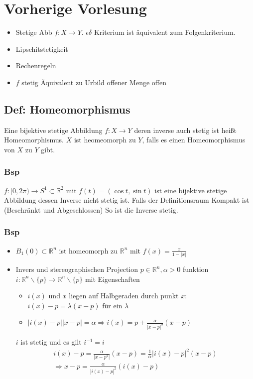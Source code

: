 \section{Vorherige Vorlesung}

\begin{itemize}
	\item Stetige Abb $f: X\rightarrow Y$. $\epsilon\delta$ Kriterium ist äquivalent zum Folgenkriterium.
	\item Lipschitstetigkeit
	\item Rechenregeln
	\item $f$ stetig Äquivalent zu Urbild offener Menge offen
\end{itemize}

\subsection{Def: Homeomorphismus}
Eine bijektive stetige Abbildung $f:X\rightarrow Y$ deren inverse auch stetig ist heißt Homeomorphismus. $X$ ist heomeomorph zu $Y$, falls es einen Homeomorphismus von $X$ zu $Y$ gibt.

\subsubsection{Bsp}
$f:[0,2\pi) \rightarrow S^1\subset\mathbb R^2$ mit $f(t) = (\cos t, \sin t)$ ist eine bijektive stetige Abbildung dessen Inverse nicht stetig ist. Falls der Definitionsraum Kompakt ist (Beschränkt und Abgeschlossen) So ist die Inverse stetig.

\subsubsection{Bsp}
\begin{itemize}
	\item $B_1(0)\subset\mathbb R^n$ ist homeomorph zu $\mathbb R^n$ mit $f(x) = \frac{x}{1-|x|}$
	\item Invers und stereographischen Projection $p\in\mathbb R^n, \alpha>0$ funktion $i: \mathbb R^n \backslash\{p\} \rightarrow \mathbb R^n \backslash \{p\}$ mit Eigenschaften
		\begin{itemize}
			\item $i(x)$ und $x$ liegen auf Halbgeraden durch punkt $x$: $i(x) - p = \lambda(x-p)$ für ein $\lambda$
			\item $|i(x) - p||x-p| = \alpha \Rightarrow i(x) = p + \frac{\alpha}{|x-p|^2}(x-p)$
		\end{itemize}
	$i$ ist stetig und es gilt $i^{-1} = i$
	\begin{gather}
		i(x) - p = \frac{\alpha}{|x-p^2|}(x-p) = \frac{1}{\alpha}|i(x)-p|^2 (x-p)\\
		\Rightarrow x-p = \frac{\alpha}{|i(x)-p|^2}(i(x)-p)
	\end{gather}
\end{itemize}
